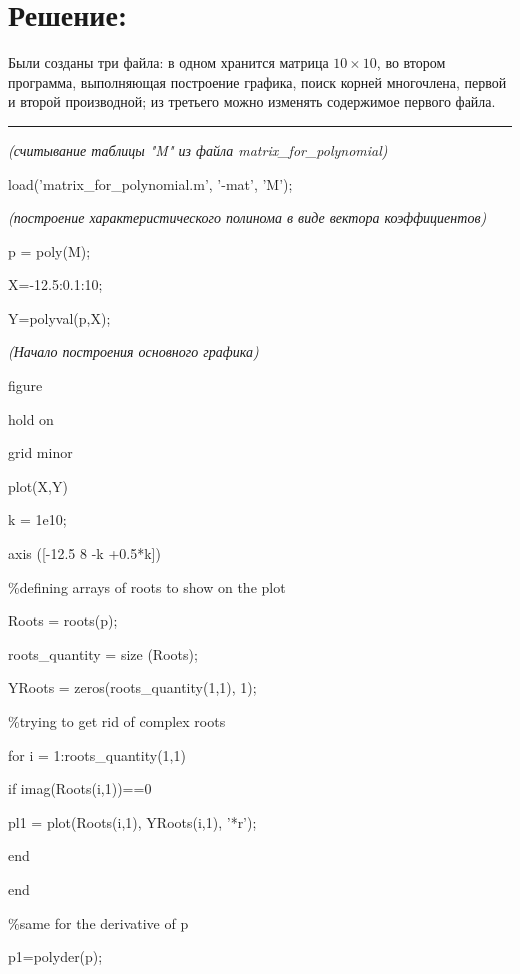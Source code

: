 \documentclass[a4paper,12pt]{article}
\begin{document}
\section{Решение:}
Были созданы три файла: в одном хранится матрица $10\times10$, во втором программа, выполняющая построение графика, поиск корней многочлена, первой и второй производной; из третьего можно изменять содержимое первого файла.\par
\vspace{10pt}
\hrule
\vspace{10pt}
\emph{(считывание таблицы "M" из файла matrix\_for\_polynomial)}\par
load('matrix\_for\_polynomial.m', '-mat', 'M');\par
\emph{(построение характеристического полинома в виде вектора коэффициентов)}\par
p = poly(M);\par
X=-12.5:0.1:10;\par
Y=polyval(p,X);\par
\emph{(Начало построения основного графика)}\par
figure\par
hold on\par
grid minor\par
plot(X,Y)\par
k = 1e10;\par
axis ([-12.5 8 -k +0.5*k])\par
{\color{green}
\%defining arrays of roots to show on the plot}\par
Roots = roots(p);\par
roots\_quantity = size (Roots);\par
YRoots = zeros(roots\_quantity(1,1), 1);\par
{\color{green}
\%trying to get rid of complex roots}\par
for i = 1:roots\_quantity(1,1)\par
\hspace{10pt}if imag(Roots(i,1))==0\par
\hspace{10pt}\hspace{10pt}pl1 = plot(Roots(i,1), YRoots(i,1), '*r');\par
\hspace{10pt}end\par
end\par
\par
{\color{green}
\%same for the derivative of p}\par
p1=polyder(p);\par
\end{document}

